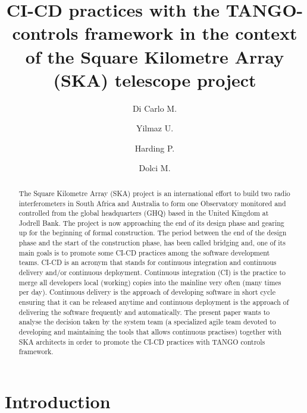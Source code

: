 \documentclass[a4paper]{spie}  %
\title{CI-CD practices with the TANGO-controls framework in the context of the Square Kilometre Array (SKA) telescope project}
\author[a]{Di Carlo M.}
\author[b]{Yilmaz U.}
\author[b]{Harding P.}
\author[a]{Dolci M.}
\affil[a]{INAF Osservatorio Astronomico d'Abruzzo, Teramo, Italy}
\affil[b]{SKA Organisation, Macclesfield, UK}
\begin{document}
 
\maketitle

\begin{abstract}
The Square Kilometre Array (SKA) project is an international effort to build two radio interferometers in South Africa and Australia to form one Observatory monitored and controlled from the global headquarters (GHQ) based in the United Kingdom at Jodrell Bank. The project is now approaching the end of its design phase and gearing up for the beginning of formal construction. The period between the end of the design phase and the start of the construction phase, has been called bridging and, one of its main goals is to promote some CI-CD practices among the software development teams. CI-CD is an acronym that stands for continuous integration and continuous delivery and/or continuous deployment. Continuous integration (CI) is the practice to merge all developers local (working) copies into the mainline very often (many times per day). Continuous delivery is the approach of developing software in short cycle ensuring that it can be released anytime and continuous deployment is the approach of delivering the software frequently and automatically. The present paper wants to analyse the decision taken by the system team (a specialized agile team devoted to developing and maintaining the tools that allows continuous practises) together with SKA architects in order to promote the CI-CD practices with TANGO controls framework. 
\end{abstract}


\section{Introduction}
\label{sec:intro}  %
\end{document}
